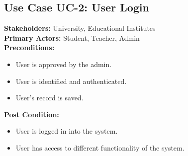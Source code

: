 \subsection{Use Case UC-2: User Login}
\textbf{Stakeholders: } University, Educational Institutes \\
\textbf{Primary Actors: } Student, Teacher, Admin \\
\textbf{Preconditions: }
\begin{itemize}
\item User is approved by the admin.
\item User is identified and authenticated.
\item User's record is saved.
\end{itemize}
\textbf{Post Condition: }
\begin{itemize}
\item User is logged in into the system.
\item User has access to different functionality of the system.
\end{itemize}

